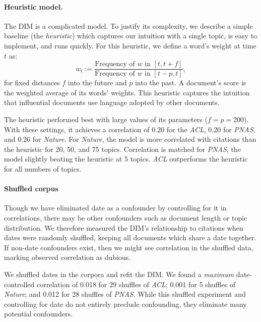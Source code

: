 \paragraph{Heuristic model.} 
 The DIM is a complicated model. To
justify its complexity, we describe a simple baseline (the
\emph{heuristic}) which captures our intuition with a single topic, is
easy to implement, and runs quickly.  For this heuristic, we define a
word's weight at time $t$ as:
\[
w_t := \textstyle \frac{\mbox{Frequency of } w \mbox{ in } [t, t + f] }
{\mbox{Frequency of }w \mbox{ in }[t - p, t]
},
\]
for fixed distances $f$ into the future and $p$ into the past.
A document's score is the weighted average of its words'
weights. This heuristic captures the intuition that influential
documents use language adopted by other documents.


The heuristic performed best with large values of its parameters
($f=p=200$). With these settings, it achieves a correlation of 0.20 for
the \emph{ACL}, 0.20 for \emph{PNAS}, and 0.26 for \emph{Nature}.  For
\emph{Nature}, the model is more correlated with citations than the
heuristic for 20, 50, and 75 topics.  Correlation is matched for
\emph{PNAS}, the model slightly beating the heuristic at 5 topics.
\emph{ACL} outperforms the heuristic for all numbers of topics.

\paragraph{Shuffled corpus} Though we have eliminated date as a
confounder by controlling for it in correlations, there may be other
confounders such as document length or topic distribution.  We
therefore measured the DIM's relationship to citations when dates were
randomly shuffled, keeping all documents which share a date
together. If non-date confounders exist, then we might see correlation
in the shuffled data, marking observed correlation as dubious.

We shuffled dates in the corpora and refit the DIM.  We found a
\emph{maximum} date-controlled correlation of 0.018 for 29 shuffles of
\emph{ACL}; 0.001 for 5 shuffles of \emph{Nature}; and 0.012 for 28
shuffles of \emph{PNAS}. While this shuffled experiment and
controlling for date do not entirely preclude confounding, they eliminate many
potential confounders.

